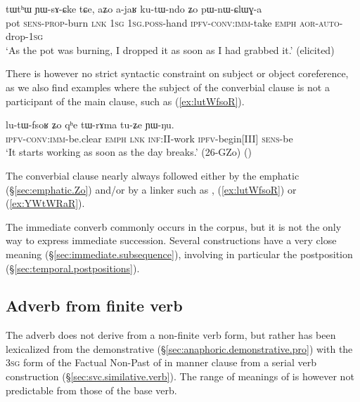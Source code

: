 \begin{exe}
\ex \label{ex:kutWndo} 
\gll tɯtʰɯ ɲɯ-sɤ-ɕke tɕe, aʑo a-jaʁ ku-tɯ-ndo ʑo pɯ-nɯ-ɕlɯɣ-a \\
pot \textsc{sens}-\textsc{prop}-burn \textsc{lnk} \textsc{1sg} \textsc{1sg}.\textsc{poss}-hand \textsc{ipfv}-\textsc{conv}:\textsc{imm}-take \textsc{emph} \textsc{aor}-\textsc{auto}-drop-\textsc{1sg} \\
\glt `As the pot was burning, I dropped it as soon as I had grabbed it.' (elicited)
\end{exe}

There is however no strict syntactic constraint on subject or object coreference, as we also find examples where the subject of the converbial clause is not a participant of the main clause, such as (\ref{ex:lutWfsoR}). 

\begin{exe}
\ex \label{ex:lutWfsoR} 
\gll  lu-tɯ-fsoʁ ʑo qʰe tɯ-rɤma tu-ʑe ɲɯ-ŋu. \\
\textsc{ipfv}-\textsc{conv}:\textsc{imm}-be.clear \textsc{emph} \textsc{lnk} \textsc{inf}:\textsc{II}-work \textsc{ipfv}-begin[III] \textsc{sens}-be \\
\glt `It starts working as soon as the day breaks.' (26-GZo)
()
\end{exe}

The converbial clause nearly always followed either by the emphatic  (§\ref{sec:emphatic.Zo}) and/or by a linker such as ,  (\ref{ex:lutWfsoR}) or  (\ref{ex:YWtWRaR}).

The immediate converb commonly occurs in the corpus, but it is not the only way to express immediate succession. Several constructions have a very close meaning (§\ref{sec:immediate.subsequence}), involving in particular the postposition  (§\ref{sec:temporal.postpositions}).

\subsection{Adverb from finite verb} \label{sec:nWfse}
The adverb  does not derive from a non-finite verb form, but rather has been lexicalized from the demonstrative  (§\ref{sec:anaphoric.demonstrative.pro}) with the \textsc{3sg} form of the Factual Non-Past of  in manner clause from a serial verb construction (§\ref{sec:svc.similative.verb}). The range of meanings of  is however not predictable from those of the base verb.

